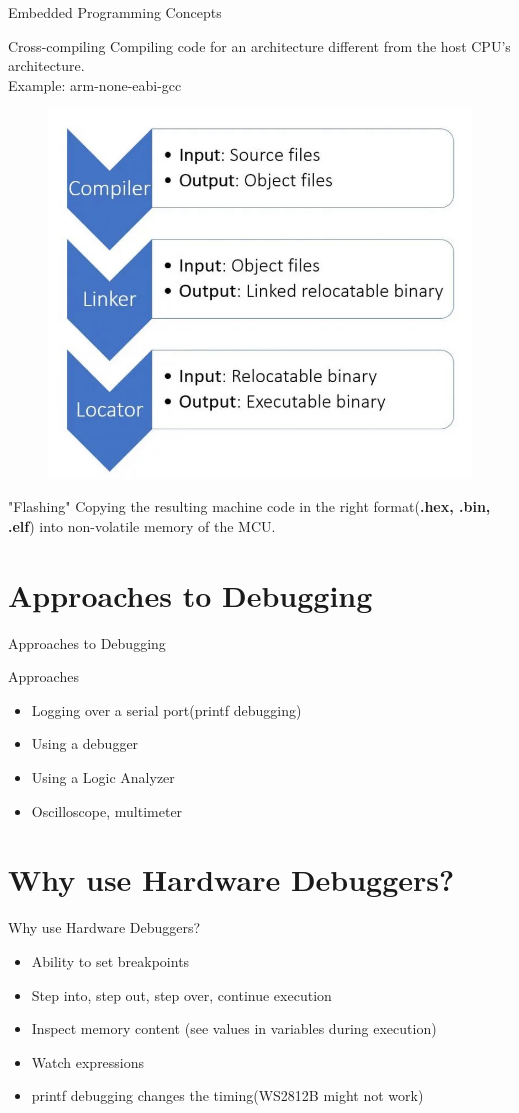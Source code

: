 \documentclass{beamer}
\begin{document}
	\begin{frame}{Embedded Programming Concepts}
		\begin{block}{Cross-compiling}
			Compiling code for an architecture different from the host CPU's architecture.\\
			Example: arm-none-eabi-gcc
		\end{block}
	\begin{figure}
		\includegraphics[width=.7\linewidth,height=.3\linewidth]{images/compilation_steps.jpg}
	\end{figure}

	\begin{block}{"Flashing"}
		Copying the resulting machine code in the right format(\textbf{.hex, .bin, .elf}) into non-volatile memory of the MCU.
	\end{block}
	\end{frame}

\section{Approaches to Debugging}
\begin{frame}{Approaches to Debugging}
		\begin{block}{Approaches}
		\begin{itemize}
			\item Logging over a serial port(printf debugging)
			\item Using a debugger
			\item Using a Logic Analyzer
			\item Oscilloscope, multimeter
		\end{itemize}
	\end{block}
\end{frame}

\section{Why use Hardware Debuggers?}
\begin{frame}{Why use Hardware Debuggers?}
	\begin{itemize}
		\item Ability to set breakpoints
		\item Step into, step out, step over, continue execution
		\item Inspect memory content (see values in variables during execution)
		\item Watch expressions
		\item printf debugging changes the timing(WS2812B might not work)
	\end{itemize}
\end{frame}
\end{document}
